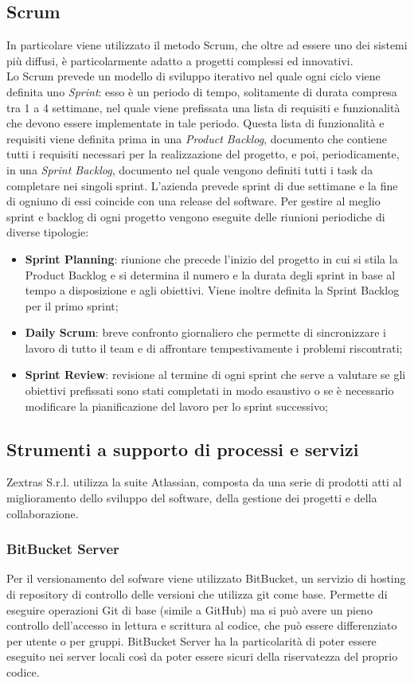 \subsection{Scrum}
In particolare  viene utilizzato il metodo Scrum, che oltre ad essere uno dei sistemi più diffusi, è particolarmente adatto a progetti complessi ed innovativi.\\
Lo Scrum prevede un modello di sviluppo iterativo nel quale ogni ciclo viene definita uno \emph{Sprint}: esso è un periodo di tempo, solitamente di durata compresa tra 1 a 4 settimane, nel quale viene prefissata una lista di requisiti e funzionalità che devono essere implementate in tale periodo.
Questa lista di funzionalità e requisiti viene definita prima in una \emph{Product Backlog}, documento che contiene tutti i requisiti necessari per la realizzazione del progetto, e poi, periodicamente, in una \emph{Sprint Backlog}, documento nel quale vengono definiti tutti i task da completare nei singoli sprint.
L'azienda prevede sprint di due settimane e la fine di ogniuno di essi coincide con una release del software.
Per gestire al meglio sprint e backlog di ogni progetto vengono eseguite delle riunioni periodiche di diverse tipologie:
\begin{itemize}
	\item \textbf{Sprint Planning}: riunione che precede l'inizio del progetto in cui si stila la Product Backlog e si determina il numero e la durata degli sprint in base al tempo a disposizione e agli obiettivi. Viene inoltre definita la Sprint Backlog per il primo sprint;
	\item \textbf{Daily Scrum}: breve confronto giornaliero che permette di sincronizzare i lavoro di tutto il team e di affrontare tempestivamente i problemi riscontrati;
	\item \textbf{Sprint Review}: revisione al termine di ogni sprint che serve a valutare se gli obiettivi prefissati sono stati completati in modo esaustivo o se è necessario modificare la pianificazione del lavoro per lo sprint successivo;
\end{itemize}

\subsection{Strumenti a supporto di processi e servizi}
Zextras S.r.l. utilizza la suite Atlassian, composta da una serie di prodotti atti al miglioramento dello sviluppo del software, della gestione dei progetti e della collaborazione. 
\subsubsection{BitBucket Server}
Per il versionamento del sofware viene utilizzato BitBucket, un servizio di hosting di repository di controllo delle versioni  che utilizza git come base. Permette  di eseguire operazioni Git di base (simile a GitHub) ma si può avere un pieno controllo dell'accesso in lettura e scrittura al codice, che può essere differenziato per utente o per gruppi. BitBucket Server ha la particolarità di poter essere eseguito nei server locali così da poter essere sicuri della riservatezza del proprio codice.
